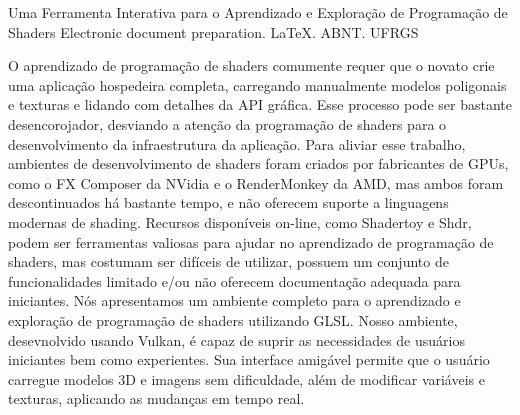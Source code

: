 
\begin{englishabstract}
{ Uma Ferramenta Interativa para o Aprendizado e Exploração de Programação de Shaders }
{ Electronic document preparation. \LaTeX. ABNT. UFRGS }

    O aprendizado de programação de shaders comumente requer que o novato crie uma aplicação hospedeira completa, carregando manualmente modelos poligonais e texturas e lidando com detalhes da API gráfica. Esse processo pode ser bastante desencorojador, desviando a atenção da programação de shaders para o desenvolvimento da infraestrutura da aplicação. Para aliviar esse trabalho, ambientes de desenvolvimento de shaders foram criados por fabricantes de GPUs, como o FX Composer da NVidia e o RenderMonkey da AMD, mas ambos foram descontinuados há bastante tempo, e não oferecem suporte a linguagens modernas de shading. Recursos disponíveis on-line, como Shadertoy e Shdr, podem ser ferramentas valiosas para ajudar no aprendizado de programação de shaders, mas costumam ser difíceis de utilizar, possuem um conjunto de funcionalidades limitado e/ou não oferecem documentação adequada para iniciantes. Nós apresentamos um ambiente completo para o aprendizado e exploração de programação de shaders utilizando GLSL. Nosso ambiente, desevnolvido usando Vulkan, é capaz de suprir as necessidades de usuários iniciantes bem como experientes. Sua interface amigável permite que o usuário carregue modelos 3D e imagens sem dificuldade, além de modificar variáveis e texturas, aplicando as mudanças em tempo real.

\end{englishabstract}
